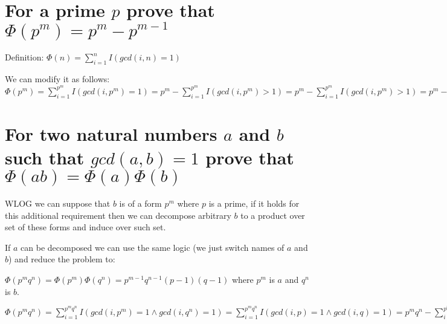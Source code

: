 \documentclass[11pt]{article}
\begin{document}
    \part*{For a prime $p$ prove that $\Phi(p^m) = p^m - p^{m-1}$}

    Definition: $\Phi(n) = \sum\limits_{i=1}^n I(gcd(i,n) = 1)$

    We can modify it as follows: $\Phi(p^m) = \sum\limits_{i=1}^{p^m} I(gcd(i,p^m) = 1) = p^m - \sum\limits_{i=1}^{p^m} I(gcd(i,p^m) > 1) = p^m - \sum\limits_{i=1}^{p^m} I(gcd(i,p^m) > 1) = p^m - |\{p, 2p, \dots p^m\}| = p^m - |\{1, 2, \dots p^{m-1}\}| = p^m - p^{m-1} = p^{m-1}(p-1) \square$

    \part*{For two natural numbers $a$ and $b$ such that $gcd(a, b) = 1$ prove that $\Phi(ab) = \Phi(a) \Phi(b)$}

    WLOG we can suppose that $b$ is of a form $p^m$ where $p$ is a prime, if it holds for this additional requirement then we can decompose arbitrary $b$ to a product over set of these forms and induce over such set.

    If $a$ can be decomposed we can use the same logic (we just switch names of $a$ and $b$) and reduce the problem to:

    $\Phi(p^m q^n) = \Phi(p^m) \Phi(q^n) = p^{m-1} q^{n-1} (p-1)(q-1)$ where $p^m$ is $a$ and $q^n$ is $b$.

    $\Phi(p^m q^n) = \sum\limits_{i=1}^{p^m q^n} I(gcd(i,p^m) = 1 \wedge gcd(i,q^n) = 1) = \sum\limits_{i=1}^{p^m q^n} I(gcd(i,p) = 1 \wedge gcd(i,q) = 1) = p^m q^n - \sum\limits_{i=1}^{p^m q^n} I(gcd(i,p) > 1 \vee gcd(i,q) > 1) = p^m q^n - |\{p,2p,\dots p^m q^n\}| - |\{q,2q,\dots p^m q^n\}| + |\{pq,2pq,\dots p^m q^n\}| = p^m q^n - p^{m-1} q^n - p^m q^{n-1} + p^{m-1} q^{n-1} = p^{m-1} q^{n-1} (pq - p - q + 1) = p^{m-1} q^{n-1} (p-1) (q-1) \square$
\end{document}
